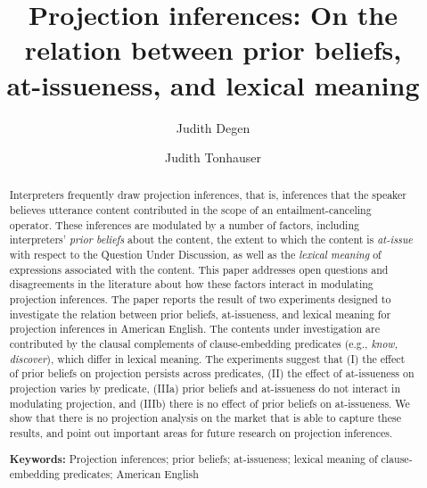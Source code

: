 \documentclass[11pt,fleqn]{article}
\newcommand{\6}{\mbox{$[\hspace*{-.6mm}[$}}
\newcommand{\9}{\mbox{$]\hspace*{-.6mm}]$}}
\begin{document}
\title{Projection inferences: On the relation between prior beliefs, \\ at-issueness, and lexical meaning}

\author[$\bullet$]{Judith Degen}
\author[$\circ$]{Judith Tonhauser}


\renewcommand\Authands{ and }


\maketitle


\begin{abstract}

Interpreters frequently draw projection inferences, that is, inferences that the speaker believes utterance content contributed in the scope of an entailment-canceling operator. These inferences are modulated by a number of factors, including interpreters' \emph{prior beliefs} about the content, the extent to which the content is \emph{at-issue} with respect to the Question Under Discussion, as well as the \emph{lexical meaning} of expressions associated with the content. This paper addresses open questions and disagreements in the literature about how these factors interact in modulating projection inferences. The paper reports the result of two experiments designed to investigate the relation between prior beliefs, at-issueness, and lexical meaning for projection inferences in American English. The contents under investigation are contributed by the clausal complements of clause-embedding predicates (e.g., \emph{know, discover}), which differ in lexical meaning. The experiments suggest that (I) the effect of prior beliefs on projection persists across predicates, (II) the effect of at-issueness on projection varies by predicate, (IIIa) prior beliefs and at-issueness do not interact in modulating projection, and (IIIb) there is no effect of prior beliefs on at-issueness. We show that there is no projection analysis on the market that is able to capture these results, and point out important areas for future research on projection inferences.

\vspace*{.7cm}
\noindent
{\bf Keywords:} Projection inferences; prior beliefs; at-issueness; lexical meaning of clause-embedding predicates; American English  \\

\end{abstract}
\end{document}
